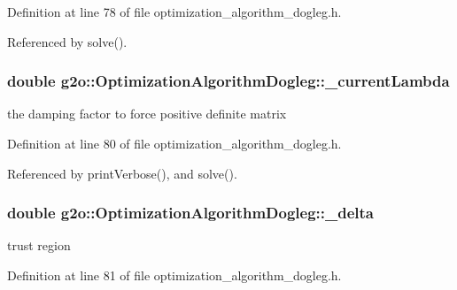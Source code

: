 Definition at line 78 of file optimization\+\_\+algorithm\+\_\+dogleg.\+h.



Referenced by solve().

\subsubsection[{\texorpdfstring{\+\_\+current\+Lambda}{_currentLambda}}]{\setlength{\rightskip}{0pt plus 5cm}double g2o\+::\+Optimization\+Algorithm\+Dogleg\+::\+\_\+current\+Lambda\hspace{0.3cm}{\ttfamily [protected]}}\hypertarget{classg2o_1_1OptimizationAlgorithmDogleg_aacc051a6740fc6017dac7c424dc7df3d}{}\label{classg2o_1_1OptimizationAlgorithmDogleg_aacc051a6740fc6017dac7c424dc7df3d}


the damping factor to force positive definite matrix 



Definition at line 80 of file optimization\+\_\+algorithm\+\_\+dogleg.\+h.



Referenced by print\+Verbose(), and solve().

\subsubsection[{\texorpdfstring{\+\_\+delta}{_delta}}]{\setlength{\rightskip}{0pt plus 5cm}double g2o\+::\+Optimization\+Algorithm\+Dogleg\+::\+\_\+delta\hspace{0.3cm}{\ttfamily [protected]}}\hypertarget{classg2o_1_1OptimizationAlgorithmDogleg_a3484b12efddd9fc0051100634effecd6}{}\label{classg2o_1_1OptimizationAlgorithmDogleg_a3484b12efddd9fc0051100634effecd6}


trust region 



Definition at line 81 of file optimization\+\_\+algorithm\+\_\+dogleg.\+h.



